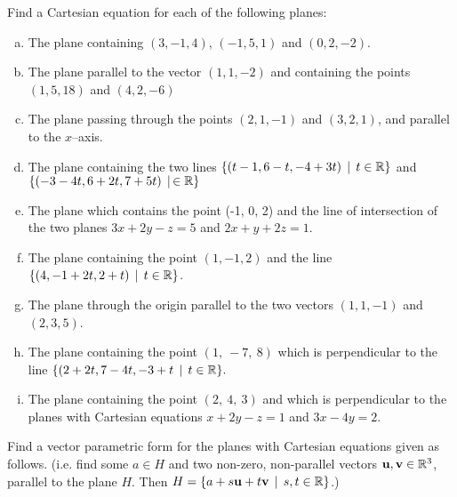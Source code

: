 \begin{prob}
\end{prob} \begin{prob} \label{prob03.6}  Find a Cartesian equation for each of the following planes:

\medskip
\begin{enumerate}[a)]
\item The plane containing $(3, -1, 4)$, $(-1, 5, 1)$ and $(0, 2, -2)$.\medskip

\item\sov  The plane parallel to the vector $(1, 1, -2)$  and containing  the points $(1, 5, 18)$ and $(4, 2, -6)$ \medskip 

\item  The plane passing through the points  $(2, 1, -1)$ and $(3, 2, 1)$, and parallel to the $x$--axis. \medskip 
%
\item\sov  The plane containing the   two lines 
$ \{(t-1,6-t,-4+3t)\,\mid \, t \in \mathbb{R} \}$ and 
 $ \{(-3 -4t, 6+ 2t,  7+5t)\,\mid \, \in \mathbb{R} \} $    \medskip  
\item The plane which contains the point (-1, 0, 2) and the line of intersection of the two planes $3x + 2y - z = 5$ and $2x + y + 2z = 1$.  \medskip  
\item\sov The plane containing the point $(1, -1, 2)$  and the line \hfill \\$\{(4, -1 + 2t,2 + t)\,\mid \, t \in \mathbb{R} \}$. \medskip
\item The plane through the origin parallel to the two vectors  $(1, 1, -1)$ and $(2, 3, 5)$.\medskip
\item\sov The plane containing the point $(1,\ -7,\ 8)$ which is perpendicular to the line $\{(2+2t,7-4t,-3+t\,\mid \,  t\in \mathbb{R} \}.$ \smallskip  
\item The plane containing the point  $(2,\ 4,\ 3)$ and which is perpendicular to the planes with Cartesian equations $x+2y-z=1$  and $3x-4y=2$.  


\end{enumerate}
 

\end{prob} \begin{prob} \label{prob03.7}   Find a vector parametric form  for  the planes with Cartesian equations given as follows. (i.e. find some $a \in H$ and two non-zero, non-parallel vectors $\mathbf{u}, \mathbf{v} \in \mathbb{R}^3$, parallel to the plane $H$. Then  $H=\{a+ s \mathbf{u} + t \mathbf{v}\,\mid \, s,t \in \mathbb{R} \}$.)\medskip
\begin{enumerate}[a)]


\end{enumerate}
\end{prob}
